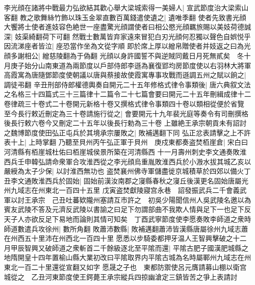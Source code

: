 李光顔在諸將中戰最力弘欲結其歡心舉大梁城索得一美婦人|{
	宣武節度治大梁索山客翻}
教之歌舞絲竹飾以珠玉金翠直數百萬錢遣使遺之|{
	遺唯季翻}
使者先致書光顔大饗將士使者進妓容色絶世一座盡驚光顔謂使者曰相公愍光顔羈旅賜以美妓荷德誠深|{
	妓渠綺翻荷下可翻}
然戰士數萬皆弃家遠來冒犯白刃光顔何忍獨以聲色自娯悦乎因流涕座者皆泣|{
	座恐當作坐為文從字順}
即於席上厚以繒帛贈使者并妓返之曰為光顔多謝相公|{
	繒慈陵翻為于偽翻}
光顔以身許國誓不與逆賊同戴日月死無貳矣　冬十月庚子始分山南東道為兩節度以戶部侍郎李遜為襄復郢均房節度使以右羽林大將軍高霞寓為唐隨鄧節度使朝議以唐與蔡接故使霞寓專事攻戰而遜調五州之賦以餉之|{
	調徒弔翻}
辛丑刑部侍郎權德輿奏自開元二十五年修格式律令事類後|{
	唐六典叙文法之名格三十四篇式三十三篇律十二篇令二十七篇會要曰開元二十五年刪緝成律十二卷律疏三十卷式二十卷開元新格十卷又撰格式律令事類四十卷以類相從便於省覽}
至今長行敕近刪定為三十卷請施行從之|{
	會要開元十九年裴光庭等奏令有司刪撰格後長行敕六卷今又刪定二十五年以後長行勅為三十卷}
上雖絶王承宗朝貢未有詔討之魏博節度使田弘正屯兵於其境承宗屢敗之|{
	敗補邁翻下同}
弘正忿表請擊之上不許表十上|{
	上時掌翻}
乃聽至貝州丙午弘正軍于貝州　庚戍東都奏盗焚栢崖倉|{
	宋白曰河清縣有栢崖城杜佑曰栢崖城侯景所築在河清縣西}
十一月壽州刺史李文通奏敗淮西兵壬申韓弘請命衆軍合攻淮西從之李光顔烏重胤敗淮西兵於小溵水拔其城乙亥以嚴綬為太子少保|{
	以討淮西無功也}
盗焚襄州佛寺軍儲盡徙京城積草於四郊以備火丁丑李文通敗淮西兵於固始|{
	固始前漢汝南郡之寖縣春秋之寖丘後漢更名固始唐屬光州九域志在州東北一百四十五里}
戊寅盗焚獻陵寢宫永巷　詔發振武兵二千會義武軍以討王承宗　己丑吐蕃欵隴州塞請互市許之　初吳少陽聞信州人吳武陵名邀以為賓友武陵不答及元濟反武陵以書諭之曰足下勿謂部曲不我欺人情與足下一也足下反天子人亦欲反足下易地而論則其情可知矣　丁酉武寧節度使李愿奏敗李師道之衆時師道數遣兵攻徐州|{
	數所角翻}
敗蕭沛數縣|{
	敗補邁翻蕭沛皆漢縣唐屬徐州九域志蕭在州西五十里沛在州西北一百四十里}
愿悉以步騎委都押牙温人王智興擊破之十二月甲辰智興又破師道之衆斬首二千餘級逐北至平隂而還|{
	平隂古肥子國漢肥城縣之地隋開皇十四年置榆山縣大業初改曰平隂取界内平隂古城為名時屬鄆州九域志在州東北一百二十里還從宣翻又如字}
愿晟之子也　東都防禦使呂元膺請募山棚以衛宫城從之　乙丑河東節度使王鍔薨王承宗縱兵四掠幽滄定三鎮皆苦之爭上表請討

